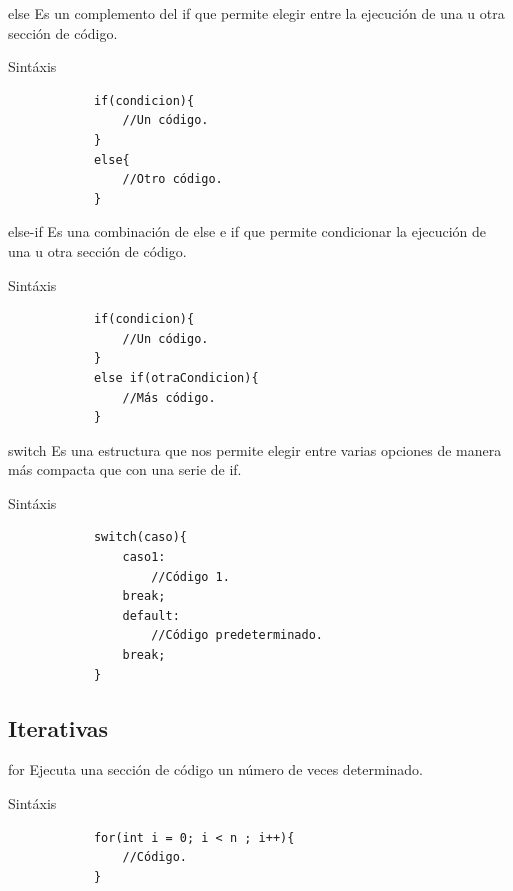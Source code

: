\documentclass[handout, 14pt]{beamer}
\begin{document}
\begin{frame}[fragile]{else}
    Es un complemento del if que permite elegir entre la ejecución de una u otra sección de código.
    \begin{block}{Sintáxis}
        \begin{verbatim}
            if(condicion){
                //Un código.
            }
            else{
                //Otro código.
            }
        \end{verbatim}
    \end{block}
\end{frame}

\begin{frame}[fragile]{else-if}
    Es una combinación de else e if que permite condicionar la ejecución de una u otra sección de código.
    \begin{block}{Sintáxis}
        \begin{verbatim}
            if(condicion){
                //Un código.
            }
            else if(otraCondicion){
                //Más código.
            }
        \end{verbatim}
    \end{block}
\end{frame}

\begin{frame}[fragile]{switch}
    Es una estructura que nos permite elegir entre varias opciones de manera más compacta que con una serie de if.
    \begin{block}{Sintáxis}
        \begin{verbatim}
            switch(caso){
                caso1:
                    //Código 1.
                break;
                default:
                    //Código predeterminado.
                break;
            }
        \end{verbatim}
    \end{block}
\end{frame}

\subsection{Iterativas}
\begin{frame}[fragile]{for}
    Ejecuta una sección de código un número de veces determinado.
    \begin{block}{Sintáxis}
        \begin{verbatim}
            for(int i = 0; i < n ; i++){
                //Código.
            }
        \end{verbatim}
    \end{block}
\end{frame}
\end{document}
